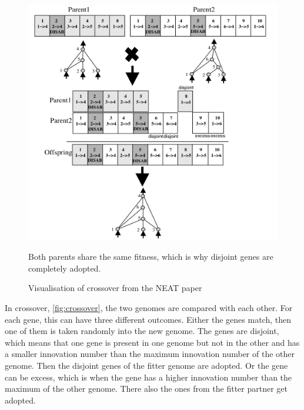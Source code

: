 \begin{figure}[h]
	\centering
	\includegraphics[width=0.9\linewidth]{mating}
	\caption{Visualisation of crossover from the NEAT paper \cite{neat}}
	
	\small
	 {Both parents share the same fitness, which is why disjoint genes are completely adopted.}
	\label{fig:crossover}
\end{figure}
In crossover, \autoref{fig:crossover}, the two genomes are compared with each other. For each gene, this can have three different outcomes. Either the genes match, then one of them is taken randomly into the new genome. The genes are disjoint, which means that one gene is present in one genome but not in the other and has a smaller innovation number than the maximum innovation number of the other genome. Then the disjoint genes of the fitter genome are adopted. Or the gene can be excess, which is when the gene has a higher innovation number than the maximum of the other genome. There also the ones from the fitter partner get adopted.


